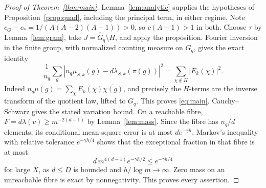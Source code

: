 \documentclass[11pt]{article}
\theoremstyle{remark}\newtheorem{remark}[theorem]{Remark}
\begin{document}
\begin{proof}[Proof of Theorem~\ref{thm:main}]
Lemma~\ref{lem:analytic} supplies the hypotheses of Proposition~\ref{prop:quad}, including the principal term, in either regime. Note $c_G-c_*=1/(A(A-2)(A-1))>0$, so $c(A-1)>1$ in both. Choose $\tau$ by Lemma~\ref{lem:gram}, take $J=\widehat G_q\setminus H$, and apply the proposition. Fourier inversion in the finite group, with normalized counting measure on $G_q$, gives the exact identity
\begin{equation}\label{eq:parseval}
 \frac1{n_q}\sum_g|n_q\mu_{S,k}(g)-d\lambda_{S,k}(\pi(g))|^2
 =\sum_{\chi\notin H}|E_k(\chi)|^2.
\end{equation}
Indeed $n_q\mu(g)=\sum_\chi E_k(\chi)\overline{\chi(g)}$, and precisely the $H$-terms are the inverse transform of the quotient law, lifted to $G_q$. This proves \eqref{eq:main}. Cauchy--Schwarz gives the stated variation bound. On a reachable fibre, $F=d\lambda(v)\ge m^{-2(d-1)}$ by Lemma~\ref{lem:mass}. Since the fibre has $n_q/d$ elements, its conditional mean-square error is at most $de^{-\gamma h}$. Markov's inequality with relative tolerance $e^{-\gamma h/4}$ shows that the exceptional fraction in that fibre is at most
\[
 d\,m^{4(d-1)}e^{-\gamma h/2}\le e^{-\gamma h/4}
\]
for large $X$, as $d\le D$ is bounded and $h/\log m\to\infty$. Zero mass on an unreachable fibre is exact by nonnegativity. This proves every assertion.
\end{proof}
\end{document}
